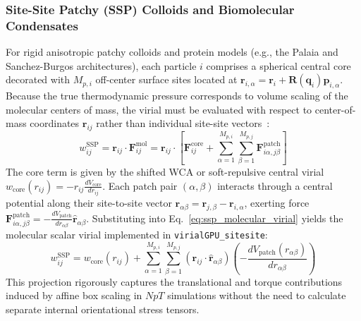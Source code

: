 \documentclass[final,5p,times,twocolumn]{elsarticle}
\begin{document}
\subsubsection{Site-Site Patchy (SSP) Colloids and Biomolecular Condensates}
For rigid anisotropic patchy colloids and protein models (e.g., the Palaia and Sanchez-Burgos architectures), each particle $i$ comprises a spherical central core decorated with $M_{p,i}$ off-center surface sites located at $\mathbf{r}_{i,\alpha} = \mathbf{r}_i + \mathbf{R}(\mathbf{q}_i)\mathbf{p}_{i,\alpha}$. Because the true thermodynamic pressure corresponds to volume scaling of the molecular centers of mass, the virial must be evaluated with respect to center-of-mass coordinates $\mathbf{r}_{ij}$ rather than individual site-site vectors~\cite{allen2017computer}:
\begin{equation}
    w_{ij}^{\text{SSP}} = \mathbf{r}_{ij} \cdot \mathbf{F}_{ij}^{\text{mol}} = \mathbf{r}_{ij} \cdot \left[ \mathbf{F}_{ij}^{\text{core}} + \sum_{\alpha=1}^{M_{p,i}} \sum_{\beta=1}^{M_{p,j}} \mathbf{F}_{i\alpha, j\beta}^{\text{patch}} \right]
    \label{eq:ssp_molecular_virial}
\end{equation}
The core term is given by the shifted WCA or soft-repulsive central virial $w_{\text{core}}(r_{ij}) = -r_{ij} \frac{dV_{\text{core}}}{dr_{ij}}$. Each patch pair $(\alpha, \beta)$ interacts through a central potential along their site-to-site vector $\mathbf{r}_{\alpha\beta} = \mathbf{r}_{j,\beta} - \mathbf{r}_{i,\alpha}$, exerting force $\mathbf{F}_{i\alpha, j\beta}^{\text{patch}} = -\frac{dV_{\text{patch}}}{dr_{\alpha\beta}} \hat{\mathbf{r}}_{\alpha\beta}$. Substituting into Eq.~\eqref{eq:ssp_molecular_virial} yields the molecular scalar virial implemented in \texttt{virialGPU\_sitesite}:
\begin{equation}
    w_{ij}^{\text{SSP}} = w_{\text{core}}(r_{ij}) + \sum_{\alpha=1}^{M_{p,i}} \sum_{\beta=1}^{M_{p,j}} (\mathbf{r}_{ij} \cdot \hat{\mathbf{r}}_{\alpha\beta}) \left( -\frac{dV_{\text{patch}}(r_{\alpha\beta})}{dr_{\alpha\beta}} \right)
\end{equation}
This projection rigorously captures the translational and torque contributions induced by affine box scaling in $NpT$ simulations without the need to calculate separate internal orientational stress tensors.
\end{document}

